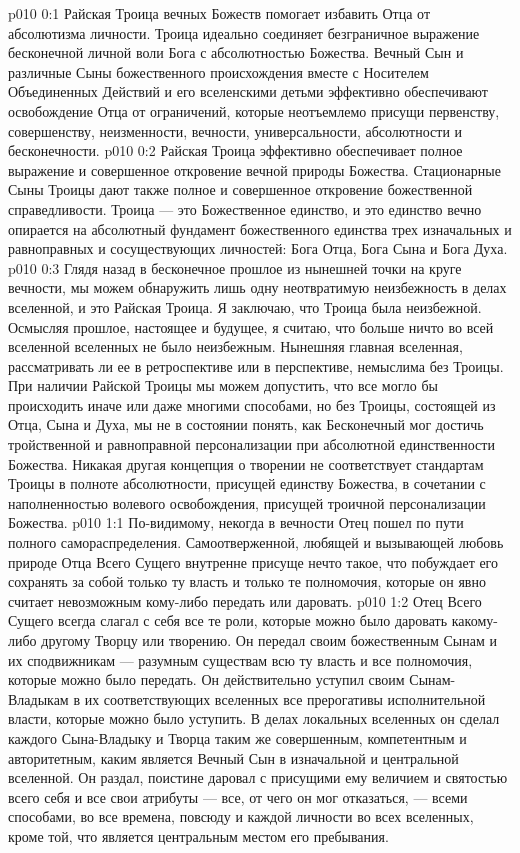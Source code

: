 \author{Вселенский Цензор}
\vs p010 0:1 Райская Троица вечных Божеств помогает избавить Отца от абсолютизма личности. Троица идеально соединяет безграничное выражение бесконечной личной воли Бога с абсолютностью Божества. Вечный Сын и различные Сыны божественного происхождения вместе с Носителем Объединенных Действий и его вселенскими детьми эффективно обеспечивают освобождение Отца от ограничений, которые неотъемлемо присущи первенству, совершенству, неизменности, вечности, универсальности, абсолютности и бесконечности.
\vs p010 0:2 Райская Троица эффективно обеспечивает полное выражение и совершенное откровение вечной природы Божества. Стационарные Сыны Троицы дают также полное и совершенное откровение божественной справедливости. Троица --- это Божественное единство, и это единство вечно опирается на абсолютный фундамент божественного единства трех изначальных и равноправных и сосуществующих личностей: Бога Отца, Бога Сына и Бога Духа.
\vs p010 0:3 \pc Глядя назад в бесконечное прошлое из нынешней точки на круге вечности, мы можем обнаружить лишь одну неотвратимую неизбежность в делах вселенной, и это Райская Троица. Я заключаю, что Троица была неизбежной. Осмысляя прошлое, настоящее и будущее, я считаю, что больше ничто во всей вселенной вселенных не было неизбежным. Нынешняя главная вселенная, рассматривать ли ее в ретроспективе или в перспективе, немыслима без Троицы. При наличии Райской Троицы мы можем допустить, что все могло бы происходить иначе или даже многими способами, но без Троицы, состоящей из Отца, Сына и Духа, мы не в состоянии понять, как Бесконечный мог достичь тройственной и равноправной персонализации при абсолютной единственности Божества. Никакая другая концепция о творении не соответствует стандартам Троицы в полноте абсолютности, присущей единству Божества, в сочетании с наполненностью волевого освобождения, присущей троичной персонализации Божества.
\vs p010 1:1 По\hyp{}видимому, некогда в вечности Отец пошел по пути полного самораспределения. Самоотверженной, любящей и вызывающей любовь природе Отца Всего Сущего внутренне присуще нечто такое, что побуждает его сохранять за собой только ту власть и только те полномочия, которые он явно считает невозможным кому\hyp{}либо передать или даровать.
\vs p010 1:2 Отец Всего Сущего всегда слагал с себя все те роли, которые можно было даровать какому\hyp{}либо другому Творцу или творению. Он передал своим божественным Сынам и их сподвижникам --- разумным существам всю ту власть и все полномочия, которые можно было передать. Он действительно уступил своим Сынам\hyp{}Владыкам в их соответствующих вселенных все прерогативы исполнительной власти, которые можно было уступить. В делах локальных вселенных он сделал каждого Сына\hyp{}Владыку и Творца таким же совершенным, компетентным и авторитетным, каким является Вечный Сын в изначальной и центральной вселенной. Он раздал, поистине даровал с присущими ему величием и святостью всего себя и все свои атрибуты --- все, от чего он мог отказаться, --- всеми способами, во все времена, повсюду и каждой личности во всех вселенных, кроме той, что является центральным местом его пребывания.
